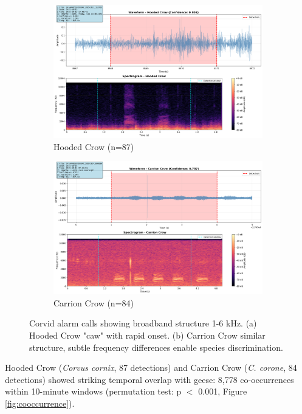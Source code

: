 \documentclass[twocolumn]{article}
\begin{document}
\begin{figure}[H]
\centering
\begin{subfigure}{0.48\columnwidth}
\includegraphics[width=\textwidth]{figures/spectrogram_hooded_crow.png}
\caption{Hooded Crow (n=87)}
\end{subfigure}
\hfill
\begin{subfigure}{0.48\columnwidth}
\includegraphics[width=\textwidth]{figures/spectrogram_carrion_crow.png}
\caption{Carrion Crow (n=84)}
\end{subfigure}
\caption{Corvid alarm calls showing broadband structure 1-6 kHz. (a) Hooded Crow "caw" with rapid onset. (b) Carrion Crow similar structure, subtle frequency differences enable species discrimination.}
\label{fig:corvid_spectrograms}
\end{figure}

Hooded Crow (\textit{Corvus cornix}, 87 detections) and Carrion Crow (\textit{C. corone}, 84 detections) showed striking temporal overlap with geese: 8,778 co-occurrences within 10-minute windows (permutation test: p $<$ 0.001, Figure \ref{fig:cooccurrence}).
\end{document}
